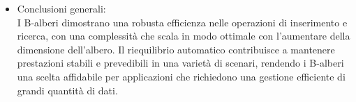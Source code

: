 \begin{itemize}
    \item Conclusioni generali:\\
        I B-alberi dimostrano una robusta efficienza nelle operazioni di inserimento e ricerca, con una complessità che scala in modo ottimale con l'aumentare della dimensione dell'albero. Il riequilibrio automatico contribuisce a mantenere prestazioni stabili e prevedibili in una varietà di scenari, rendendo i B-alberi una scelta affidabile per applicazioni che richiedono una gestione efficiente di grandi quantità di dati.

\end{itemize}



